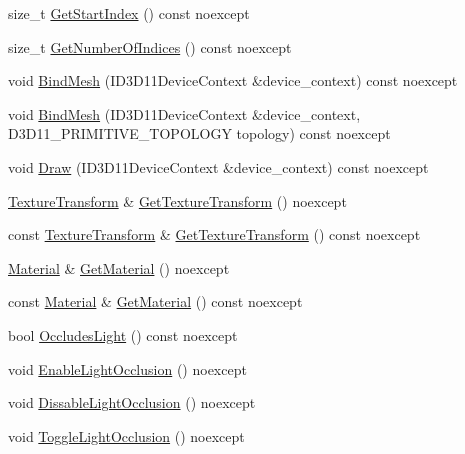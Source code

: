 \begin{DoxyCompactItemize}
size\+\_\+t \mbox{\hyperlink{classmage_1_1rendering_1_1_model_a2944b26434496b580bbbebbccd592ee3}{Get\+Start\+Index}} () const noexcept
\item 
size\+\_\+t \mbox{\hyperlink{classmage_1_1rendering_1_1_model_ab333b0fcc65bc20cb6c792b0094c5d1b}{Get\+Number\+Of\+Indices}} () const noexcept
\item 
void \mbox{\hyperlink{classmage_1_1rendering_1_1_model_a78defd61277c92a529c4811f1c7c391b}{Bind\+Mesh}} (I\+D3\+D11\+Device\+Context \&device\+\_\+context) const noexcept
\item 
void \mbox{\hyperlink{classmage_1_1rendering_1_1_model_a7793e3f1fa480cb4dc423845fc4de45f}{Bind\+Mesh}} (I\+D3\+D11\+Device\+Context \&device\+\_\+context, D3\+D11\+\_\+\+P\+R\+I\+M\+I\+T\+I\+V\+E\+\_\+\+T\+O\+P\+O\+L\+O\+GY topology) const noexcept
\item 
void \mbox{\hyperlink{classmage_1_1rendering_1_1_model_aaa10d71022d4f6ac8e51ec95861f3317}{Draw}} (I\+D3\+D11\+Device\+Context \&device\+\_\+context) const noexcept
\item 
\mbox{\hyperlink{classmage_1_1_texture_transform}{Texture\+Transform}} \& \mbox{\hyperlink{classmage_1_1rendering_1_1_model_a57e4069226ce9bade50bc17503378f08}{Get\+Texture\+Transform}} () noexcept
\item 
const \mbox{\hyperlink{classmage_1_1_texture_transform}{Texture\+Transform}} \& \mbox{\hyperlink{classmage_1_1rendering_1_1_model_adc18923fdb300d1eb753c9dcb9d30677}{Get\+Texture\+Transform}} () const noexcept
\item 
\mbox{\hyperlink{classmage_1_1rendering_1_1_material}{Material}} \& \mbox{\hyperlink{classmage_1_1rendering_1_1_model_af6e23f8327e82af4d6c2aa854329608c}{Get\+Material}} () noexcept
\item 
const \mbox{\hyperlink{classmage_1_1rendering_1_1_material}{Material}} \& \mbox{\hyperlink{classmage_1_1rendering_1_1_model_afcdf381e409cc7c7be878a60c1799c1b}{Get\+Material}} () const noexcept
\item 
bool \mbox{\hyperlink{classmage_1_1rendering_1_1_model_ac6238580ce9572b9274bf21852f73455}{Occludes\+Light}} () const noexcept
\item 
void \mbox{\hyperlink{classmage_1_1rendering_1_1_model_a6fc53c4d0d5983ecd2f1910002b4dcfc}{Enable\+Light\+Occlusion}} () noexcept
\item 
void \mbox{\hyperlink{classmage_1_1rendering_1_1_model_a4dc86a18b06ee751f2e208acc21f709e}{Dissable\+Light\+Occlusion}} () noexcept
\item 
void \mbox{\hyperlink{classmage_1_1rendering_1_1_model_ade8576cf32210153e65cd39b21940a67}{Toggle\+Light\+Occlusion}} () noexcept

\end{DoxyCompactItemize}
